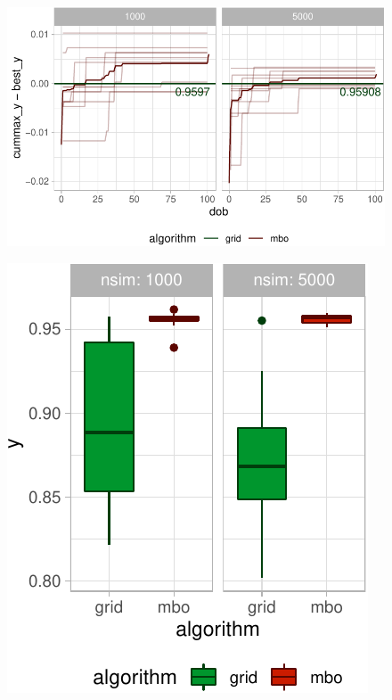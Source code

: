 \documentclass[bimj,fleqn]{w-art}
\theoremstyle{plain}
\theoremstyle{definition}
\begin{document}
\begin{figure}[htb]
\centering
  \begin{minipage}{0.642\textwidth}
    \centering
    \includegraphics[width=\linewidth]{generated/figures/plot_opt_path_5000.pdf}%
    \label{fig:plot_opt_path_5000}
  \end{minipage}%
  \begin{minipage}{0.1\textwidth}
  \end{minipage}%
  \begin{minipage}{0.357\textwidth}
    \centering
    \includegraphics[width=\linewidth]{generated/figures/plot_boxplot_valid_y_5000.pdf}%
    \label{fig:plot_boxplot_valid_y_5000}
  \end{minipage}
\end{figure}
\end{document}
